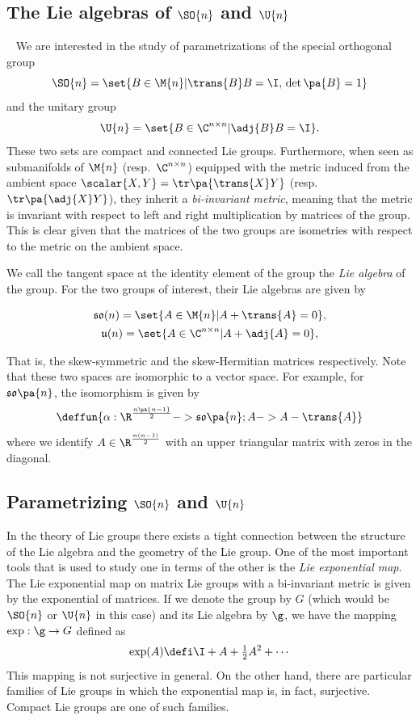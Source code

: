 \subsection{The Lie algebras of \texorpdfstring{$\SO{n}$}{SO(n)} and \texorpdfstring{$\U{n}$}{U(n)}}~\label{sec:lie_exponential_map}
We are interested in the study of parametrizations of the special orthogonal group
\[
    \SO{n} = \set{B \in \M{n} | \trans{B}B = \I,\, \det\pa{B} = 1}
\]
and the unitary group
\[
    \U{n} = \set{B \in \C^{n \times n} | \adj{B}B = \I}.
\]
These two sets are compact and connected Lie groups. Furthermore, when seen as submanifolds of $\M{n}$ (resp.\ $\C^{n \times n}$) equipped with the metric induced from the ambient space $\scalar{X, Y} = \tr\pa{\trans{X}Y}$ (resp.\ $\tr\pa{\adj{X}Y}$), they inherit a \emph{bi-invariant metric}, meaning that the metric is invariant with respect to left and right multiplication by matrices of the group. This is clear given that the matrices of the two groups are isometries with respect to the metric on the ambient space.

We call the tangent space at the identity element of the group the \emph{Lie algebra} of the group. For the two groups of interest, their Lie algebras are given by

\begin{gather*}
    \mathfrak{so}(n) = \set{A \in \M{n} | A + \trans{A} = 0},\\
    \mathfrak{u}(n) = \set{A \in \C^{n \times n} | A + \adj{A} = 0},
\end{gather*}

That is, the skew-symmetric and the skew-Hermitian matrices respectively. Note that these two spaces are isomorphic to a vector space. For example, for $\mathfrak{so}\pa{n}$, the isomorphism is given by
\[
    \deffun{\alpha : \R^{\frac{n\pa{n-1}}{2}} -> \mathfrak{so}\pa{n} ; A -> A - \trans{A}}
\]
where we identify $A \in \R^{\frac{n(n-1)}{2}}$ with an upper triangular matrix with zeros in the diagonal.

\subsection{Parametrizing \texorpdfstring{$\SO{n}$}{SO(n)} and \texorpdfstring{$\U{n}$}{U(n)}}
In the theory of Lie groups there exists a tight connection between the structure of the Lie algebra and the geometry of the Lie group. One of the most important tools that is used to study one in terms of the other is the \emph{Lie exponential map}. The Lie exponential map on matrix Lie groups with a bi-invariant metric is given by the exponential of matrices. If we denote the group by $G$ (which would be $\SO{n}$ or $\U{n}$ in this case) and its Lie algebra by $\g$, we have the mapping $\exp : \g \to G$ defined as
\[
     \exp(A) \defi \I + A + \tfrac{1}{2}A^2 + \cdots
\]
This mapping is not surjective in general. On the other hand, there are particular families of Lie groups in which the exponential map is, in fact, surjective. Compact Lie groups are one of such families.

